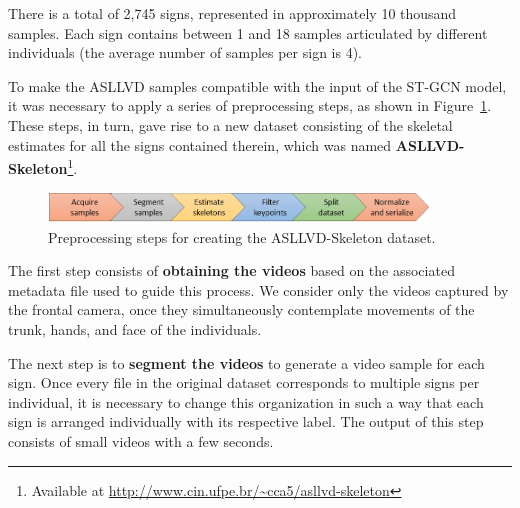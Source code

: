 There is a total of 2,745 signs, represented in approximately 10 thousand samples. Each sign contains between 1 and 18 samples articulated by different individuals (the average number of samples per sign is 4).


To make the ASLLVD samples compatible with the input of the ST-GCN model, it was necessary to apply a series of preprocessing steps, as shown in Figure~\ref{fig:preprocessamento}. These steps, in turn, gave rise to a new dataset consisting of the skeletal estimates for all the signs contained therein, which was named \textbf{ASLLVD-Skeleton}\footnote{
   Available at \url{http://www.cin.ufpe.br/~cca5/asllvd-skeleton}
}.

\begin{figure}[ht!]
    \centering
    \includegraphics[width=0.9\textwidth]{images/dataset_preprocessing_en}
    \caption{Preprocessing steps for creating the ASLLVD-Skeleton dataset.}
    \label{fig:preprocessamento}
\end{figure}


The first step consists of \textbf{obtaining the videos} based on the associated metadata file used to guide this process. We consider only the videos captured by the frontal camera, once they simultaneously contemplate movements of the trunk, hands, and face of the individuals.

The next step is to \textbf{segment the videos} to generate a video sample for each sign. Once every file in the original dataset corresponds to multiple signs per individual, it is necessary to change this organization in such a way that each sign is arranged individually with its respective label. %
The output of this step consists of small videos with a few seconds. %

